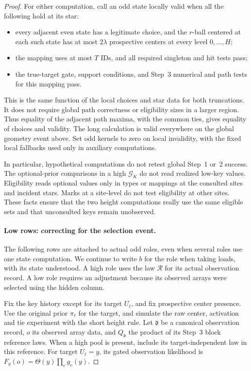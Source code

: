 \begin{proof}
For either computation, call an odd state locally valid when all the
following hold at its star:
\begin{itemize}
\item every adjacent even state has a legitimate choice, and the
\(r\)-ball centered at each such state has at most \(2\lambda\)
prospective centers at every level \(0,\ldots,H\);
\item the mapping uses at most \(T\) IDs, and all required singleton
and hit tests pass;
\item the true-target gate, support conditions, and Step~3 numerical
and path tests for this mapping pass.
\end{itemize}
This is the same function of the local choices and star data for both
truncations. It does not require global path correctness or eligibility
sizes in a larger region. Thus equality of the adjacent path maxima,
with the common ties, gives equality of choices and validity. The long
calculation is valid everywhere on the global geometry event above.
Set odd kernels to zero on local invalidity, with the fixed local
fallbacks used only in auxiliary computations.

In particular, hypothetical computations do not retest global Step~1
or~2 success. The optional-prior comparisons in a high
\(\mathcal G_K\) do not read realized low-key values. Eligibility reads
optional values only in types or mappings at the consulted sites and
incident stars. Marks at a site-level do not test eligibility at other
sites. These facts ensure that the two height computations really use
the same eligible sets and that unconsulted keys remain unobserved.

\paragraph{Low rows: correcting for the selection event.}
The following rows are attached to actual odd roles, even when several
roles use one state computation. We continue to write \(b\) for the
role when taking loads, with its state understood. A high role uses the
law \(\mathcal R\) for its actual observation record. A low role
requires an adjustment because its observed arrays were selected using
the hidden column.

Fix the key history except for its target \(U_\ell\), and fix
prospective center presence. Use the original prior \(\pi_\ell\) for
the target, and simulate the raw center, activation and tie experiment
with the short height rule. Let \(\mathfrak d\) be a canonical
observation record, \(o\) its observed array data, and
\(Q_{\mathfrak d}\) the product of its Step~3 block reference laws.
When a high pool is present, include its target-independent law in this
reference. For target \(U_\ell=y\), its gated observation likelihood
is \(F_y(o)=\Theta(y)\prod_e g_e(y)\).


\end{proof}
